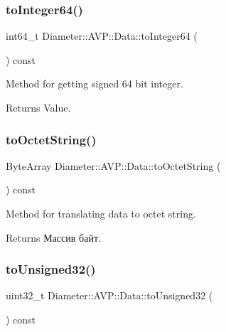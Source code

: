 \subsubsection{\texorpdfstring{to\+Integer64()}{toInteger64()}}
{\footnotesize\ttfamily int64\+\_\+t Diameter\+::\+A\+V\+P\+::\+Data\+::to\+Integer64 (\begin{DoxyParamCaption}{ }\end{DoxyParamCaption}) const}



Method for getting signed 64 bit integer. 

\begin{DoxyReturn}{Returns}
Value. 
\end{DoxyReturn}
\mbox{\label{classDiameter_1_1AVP_1_1Data_aa344738719504128278ccdecd2baea77}} 
\subsubsection{\texorpdfstring{to\+Octet\+String()}{toOctetString()}}
{\footnotesize\ttfamily Byte\+Array Diameter\+::\+A\+V\+P\+::\+Data\+::to\+Octet\+String (\begin{DoxyParamCaption}{ }\end{DoxyParamCaption}) const}



Method for translating data to octet string. 

\begin{DoxyReturn}{Returns}
Массив байт. 
\end{DoxyReturn}
\mbox{\label{classDiameter_1_1AVP_1_1Data_aa4db9af44641f1dc691fdf4736d0aace}} 
\subsubsection{\texorpdfstring{to\+Unsigned32()}{toUnsigned32()}}
{\footnotesize\ttfamily uint32\+\_\+t Diameter\+::\+A\+V\+P\+::\+Data\+::to\+Unsigned32 (\begin{DoxyParamCaption}{ }\end{DoxyParamCaption}) const}



